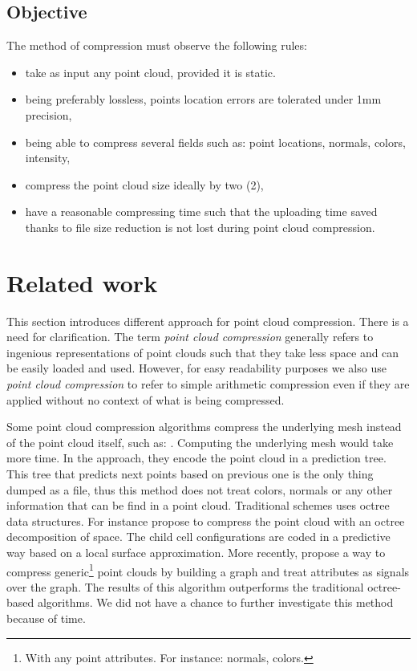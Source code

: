 \subsection{Objective}
The method of compression must observe the following rules:
\begin{itemize}
  \item take as input any point cloud, provided it is static.
  \item being preferably lossless, points location errors are tolerated under 1mm precision,
  \item being able to compress several fields such as: point locations, normals, colors, intensity,
  \item compress the point cloud size ideally by two (2),
  \item have a reasonable compressing time such that the uploading time saved thanks to file size reduction is not lost during point cloud compression.
\end{itemize}

\section{Related work}
\label{sc:work-compression}
This section introduces different approach for point cloud compression. There is a need for clarification. The term \emph{point cloud compression} generally refers to ingenious representations of point clouds such that they take less space and can be easily loaded and used. However, for easy readability purposes we also use \emph{point cloud compression} to refer to simple arithmetic compression even if they are applied without no context of what is being compressed.

Some point cloud compression algorithms compress the underlying mesh instead of the point cloud itself, such as: \cite{gumhold2, rossignac}. Computing the underlying mesh would take more time. In the \cite{compress1} approach, they encode the point cloud in a prediction tree. This tree that predicts next points based on previous one is the only thing dumped as a file, thus this method does not treat colors, normals or any other information that can be find in a point cloud. Traditional schemes uses octree data structures. For instance \cite{compress2, huang} propose to compress the point cloud with an octree decomposition of space. The child cell configurations are coded in a predictive way based on a local surface approximation. More recently, \cite{zhang} propose a way to compress generic\footnote{With any point attributes. For instance: normals, colors.} point clouds by building a graph and treat attributes as signals over the graph. The results of this algorithm outperforms the traditional octree-based algorithms. We did not have a chance to further investigate this method because of time.

